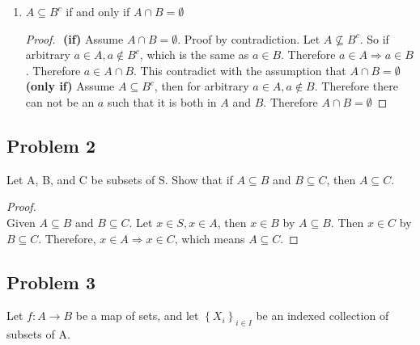 \documentclass[11pt]{article}
\begin{document}
\begin{enumerate}
  \item $A\subseteq B^{c}$ if and only if $A\cap B = \emptyset$
    \begin{proof}
      $ $\newline
      \textbf{(if)}
      Assume $A\cap B = \emptyset$. Proof by contradiction. Let $A\not\subseteq B^c$.  So if arbitrary $a\in A, a\not\in B^c$, which is the same as $a\in B$. Therefore $a\in A \Rightarrow a\in B$. Therefore $a\in A\cap B$. This contradict with the assumption that $A\cap B = \emptyset$ \\
      \textbf{(only if)}
      Assume $A\subseteq B^{c}$, then for arbitrary $a\in A, a\not\in B$. Therefore there can not be an $a$ such that it is both in $A$ and $B$. Therefore $A\cap B = \emptyset$
  \end{proof}
\end{enumerate}


\subsection*{Problem 2}
Let A, B, and C be subsets of S. Show that if $A\subseteq B$ and $B\subseteq C$, then $A\subseteq C$.

\begin{proof}
  $ $\\
  Given $A\subseteq B$ and $B\subseteq C$. Let $x\in S, x\in A$, then $x\in B$ by $A\subseteq B$. Then $x\in C$ by $B\subseteq C$. Therefore, $x\in A \Rightarrow x\in C$, which means $A\subseteq C$.
\end{proof}


\subsection*{Problem 3}
Let $f:A\to B$ be a map of sets, and let $\left\{X_{i}\right\}_{i\in I}$ be an indexed collection of subsets of A.
\end{document}
